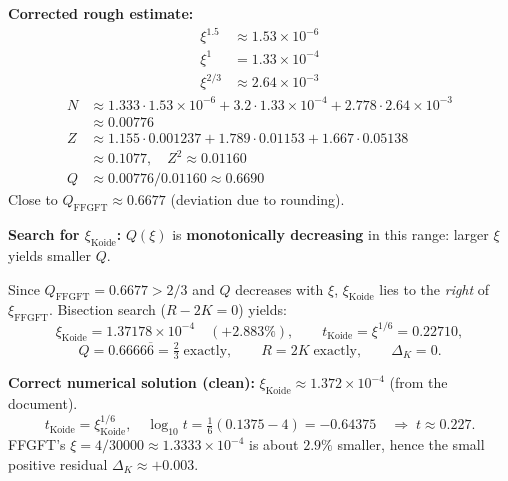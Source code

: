 \textbf{Corrected rough estimate:}
\begin{align*}
  \xi^{1.5} &\approx 1.53\times10^{-6} \\
  \xi^1 &= 1.33\times10^{-4} \\
  \xi^{2/3} &\approx 2.64\times10^{-3}
\end{align*}
\begin{align*}
  N &\approx 1.333\cdot1.53\times10^{-6}+3.2\cdot1.33\times10^{-4}
    +2.778\cdot2.64\times10^{-3} \\
    &\approx 0.00776 \\
  Z &\approx 1.155\cdot0.001237+1.789\cdot0.01153+1.667\cdot0.05138 \\
    &\approx 0.1077, \quad Z^2\approx0.01160 \\
  Q &\approx 0.00776/0.01160 \approx 0.6690
\end{align*}
Close to $Q_{\text{FFGFT}}\approx0.6677$ (deviation due to rounding).

\textbf{Search for $\xi_{\text{Koide}}$:}
$Q(\xi)$ is \textbf{monotonically decreasing} in this range:
larger $\xi$ yields smaller $Q$.

\begin{center}
\renewcommand{\arraystretch}{1.3}
\end{center}

Since $Q_{\text{FFGFT}}=0.6677>2/3$ and $Q$ decreases with $\xi$,
$\xi_{\text{Koide}}$ lies to the \emph{right} of $\xi_{\text{FFGFT}}$.
Bisection search ($R-2K=0$) yields:
\[
  \xi_{\text{Koide}} = 1.37178\times10^{-4}
  \quad (+2.883\%),
  \qquad t_{\text{Koide}} = \xi^{1/6} = 0.22710,
\]
\[
  Q = 0.6666\overline{6} = \tfrac{2}{3}\;\text{exactly},
  \qquad R = 2K\;\text{exactly},
  \qquad \Delta_K = 0.
\]

\textbf{Correct numerical solution (clean):}
$\xi_{\text{Koide}}\approx1.372\times10^{-4}$ (from the document).
\[
  t_{\text{Koide}} = \xi_{\text{Koide}}^{1/6}, \quad
  \log_{10}t = \tfrac{1}{6}(0.1375-4) = -0.64375
  \quad\Rightarrow\; t\approx0.227.
\]
FFGFT's $\xi=4/30000\approx1.3333\times10^{-4}$ is about $2.9\%$ smaller,
hence the small positive residual $\Delta_K\approx+0.003$.

